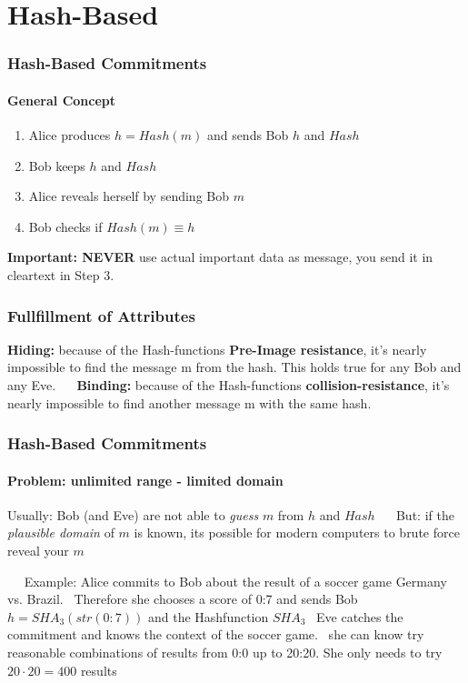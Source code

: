 \section{Hash-Based}
\begin{frame}
	\frametitle{Hash-Based Commitments}
	\framesubtitle{General Concept}
	\begin{LARGE}
		\begin{enumerate}
			\item Alice produces $h = Hash(m)$ and sends Bob $h$ and $Hash$
			\item Bob keeps $h$ and $Hash$
			\item Alice reveals herself by sending Bob $m$
			\item Bob checks if $Hash(m) \equiv h$
		\end{enumerate}
	\end{LARGE}
	
	\textbf{Important: NEVER} use actual important data as message, you send it in cleartext in Step 3. 
\end{frame}

\begin{frame}
	\frametitle{Fullfillment of Attributes}
	\begin{LARGE}
	\textbf{Hiding:} because of the Hash-functions \textbf{Pre-Image resistance}, it's nearly impossible to find the message m from the hash. This holds true for any Bob and any Eve. ~\newline ~\newline
	\textbf{Binding:} because of the Hash-functions \textbf{collision-resistance}, it's nearly impossible to find another message m with the same hash.
	\end{LARGE}
\end{frame}

\begin{frame}
	\frametitle{Hash-Based Commitments}
	\framesubtitle{Problem: unlimited range - limited domain}
	Usually: Bob (and Eve) are not able to \textit{guess} $m$ from $h$ and $Hash$
	~\newline ~\newline
	But: if the \textit{plausible domain} of $m$ is known, its possible for modern computers to brute force reveal your $m$ 
	
	~\newline ~\newline 
	Example: Alice commits to Bob about the result of a soccer game Germany vs. Brazil. ~\newline Therefore she chooses a score of 0:7 and sends Bob $h = SHA_3(str(0:7))$ and the Hashfunction $SHA_3$ ~\newline Eve catches the commitment and knows the context of the soccer game. ~\newline she can know try reasonable combinations of results from 0:0 up to 20:20. She only needs to try $20 \cdot 20 = 400$ results 
\end{frame}

